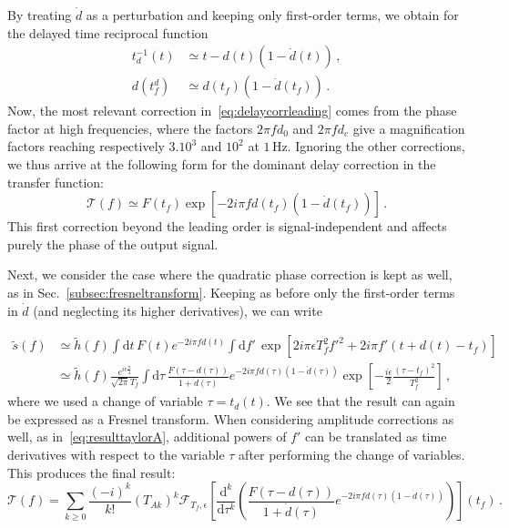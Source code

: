 \documentclass[aps,showpacs,twocolumn,
prd,superscriptaddress,nofootinbib]{revtex4-1}
\newcommand{\be}{\begin{equation}}
\newcommand{\ee}{\end{equation}}
\newcommand\ud{{\mathrm{d}}}
\newcommand\calF{{\mathcal{F}}}
\newcommand\calT{{\mathcal{T}}}
\newcommand{\nn}{\nonumber}
\newcommand{\Hz}{\,\mathrm{Hz}}
\newcommand{\tf}{t_{f}}
\newcommand{\Tf}{T_{f}}
\begin{document}
By treating $\dot{d}$ as a perturbation and keeping only first-order terms, we obtain for the delayed time reciprocal function
\begin{align}
	t_{d}^{-1}(t) &\simeq t-d(t) (1-\dot{d}(t)) \,,\nn\\
	d(t_{f}^{d}) &\simeq d(t_{f}) ( 1 - \dot{d}(t_{f})) \,.
\end{align}
Now, the most relevant correction in~\eqref{eq:delaycorrleading} comes from the phase factor at high frequencies, where the factors $2\pi f d_{0}$ and $2\pi f d_{c}$ give a magnification factors reaching respectively $3.10^{3}$ and $10^{2}$ at $1\Hz$. Ignoring the other corrections, we thus arrive at the following form for the dominant delay correction in the transfer function:
\be
	\calT(f) \simeq F(t_{f})\exp\left[ -2i\pi f d(t_{f}) (1-\dot{d}(t_{f})) \right] \,.
\ee
This first correction beyond the leading order is signal-independent and affects purely the phase of the output signal.

Next, we consider the case where the quadratic phase correction is kept as well, as in Sec.~\ref{subsec:fresneltransform}. Keeping as before only the first-order terms in $\dot{d}$ (and neglecting its higher derivatives), we can write
\begin{widetext}
\begin{align}
	\tilde{s}(f) &\simeq \tilde{h}(f) \int \ud t \, F(t) e^{-2i\pi f d(t)} \int \ud f' \, \exp\left[ 2i\pi \epsilon \Tf^{2} f'^{2} + 2i\pi f' (t+d(t) - \tf) \right] \nn\\
	&\simeq \tilde{h}(f) \frac{e^{i\epsilon\frac{\pi}{4}}}{\sqrt{2\pi}\Tf} \int \ud \tau \, \frac{F(\tau - d(\tau))}{1+\dot{d}(\tau)} e^{-2i\pi f d(\tau)(1-\dot{d}(\tau))}\exp\left[ -\frac{i\epsilon}{2} \frac{(\tau - \tf)^{2}}{\Tf^{2}} \right] \,,
\end{align}
where we used a change of variable $\tau = t_{d}(t)$. We see that the result can again be expressed as a Fresnel transform. When considering amplitude corrections as well, as in~\eqref{eq:resulttaylorA}, additional powers of $f'$ can be translated as time derivatives with respect to the variable $\tau$ after performing the change of variables. This produces the final result:
\be\label{eq:transferfinal}
	\calT(f) = \sum\limits_{k \geq 0} \frac{(-i)^{k}}{k!} (T_{Ak})^{k} \calF_{\Tf, \epsilon} \left[ \frac{\ud^{k}}{\ud \tau^{k}} \left( \frac{F(\tau - d(\tau))}{1+\dot{d}(\tau)} e^{-2i\pi f d(\tau)(1-\dot{d}(\tau))} \right) \right] (\tf) \,.
\ee
\end{widetext}
\end{document}
